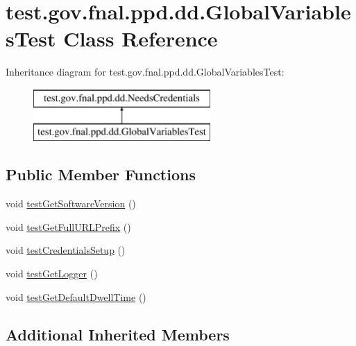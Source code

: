 \hypertarget{classtest_1_1gov_1_1fnal_1_1ppd_1_1dd_1_1GlobalVariablesTest}{\section{test.\-gov.\-fnal.\-ppd.\-dd.\-Global\-Variables\-Test Class Reference}
\label{classtest_1_1gov_1_1fnal_1_1ppd_1_1dd_1_1GlobalVariablesTest}
}
Inheritance diagram for test.\-gov.\-fnal.\-ppd.\-dd.\-Global\-Variables\-Test\-:\begin{figure}[H]
\begin{center}
\leavevmode
\includegraphics[height=2.000000cm]{classtest_1_1gov_1_1fnal_1_1ppd_1_1dd_1_1GlobalVariablesTest}
\end{center}
\end{figure}
\subsection*{Public Member Functions}
\begin{DoxyCompactItemize}
\item 
void \hyperlink{classtest_1_1gov_1_1fnal_1_1ppd_1_1dd_1_1GlobalVariablesTest_a9d76ca535a3675f7691c271ec42a6661}{test\-Get\-Software\-Version} ()
\item 
void \hyperlink{classtest_1_1gov_1_1fnal_1_1ppd_1_1dd_1_1GlobalVariablesTest_a58e4e646a5b64a2e4416aa99a0e8e6f4}{test\-Get\-Full\-U\-R\-L\-Prefix} ()
\item 
void \hyperlink{classtest_1_1gov_1_1fnal_1_1ppd_1_1dd_1_1GlobalVariablesTest_a4cc2ebdccd09fc82199a1619eb266526}{test\-Credentials\-Setup} ()
\item 
void \hyperlink{classtest_1_1gov_1_1fnal_1_1ppd_1_1dd_1_1GlobalVariablesTest_aea79d292fb8176c765f6ec549ed37529}{test\-Get\-Logger} ()
\item 
void \hyperlink{classtest_1_1gov_1_1fnal_1_1ppd_1_1dd_1_1GlobalVariablesTest_ae19faf852f1b8898c3c6914520550d12}{test\-Get\-Default\-Dwell\-Time} ()
\end{DoxyCompactItemize}
\subsection*{Additional Inherited Members}


